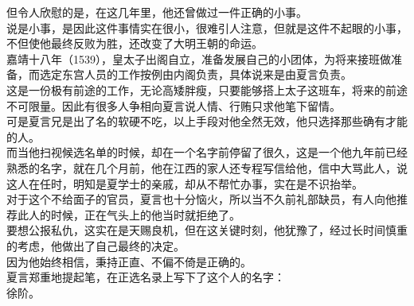 \begin{multicols}{\theparacolNo}
但令人欣慰的是，在这几年里，他还曾做过一件正确的小事。\\

说是小事，是因此这件事情实在很小，很难引人注意，但就是这件不起眼的小事，不但使他最终反败为胜，还改变了大明王朝的命运。\\

嘉靖十八年（1539），皇太子出阁自立，准备发展自己的小团体，为将来接班做准备，而选定东宫人员的工作按例由内阁负责，具体说来是由夏言负责。\\

这是一份极有前途的工作，无论高矮胖瘦，只要能够搭上太子这班车，将来的前途不可限量。因此有很多人争相向夏言说人情、行贿只求他笔下留情。\\

可是夏言兄是出了名的软硬不吃，以上手段对他全然无效，他只选择那些确有才能的人。\\

而当他扫视候选名单的时候，却在一个名字前停留了很久，这是一个他九年前已经熟悉的名字，就在几个月前，他在江西的家人还专程写信给他，信中大骂此人，说这人在任时，明知是夏学士的亲戚，却从不帮忙办事，实在是不识抬举。\\

对于这个不给面子的官员，夏言也十分恼火，所以当不久前礼部缺员，有人向他推荐此人的时候，正在气头上的他当时就拒绝了。\\

要想公报私仇，这实在是天赐良机，但在这关键时刻，他犹豫了，经过长时间慎重的考虑，他做出了自己最终的决定。\\

因为他始终相信，秉持正直、不偏不倚是正确的。\\

夏言郑重地提起笔，在正选名录上写下了这个人的名字：\\

徐阶。\\
\ifnum{}
	\end{multicols}
\fi
\newpage
